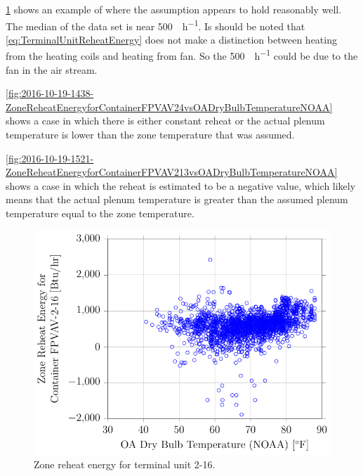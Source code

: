 \figref{}
\ref{fig:2016-10-19-1424-ZoneReheatEnergyforContainerFPVAV216vsOADryBulbTemperatureNOAA}
shows an example of where the assumption appears to hold reasonably well.  
The median of the data set is near \SI{500}{\btu\per\hour}. Is should be
noted that  \ref{eq:TerminalUnitReheatEnergy} does not make a
distinction between heating from the heating coils and heating from fan.
So the \SI{500}{\btu\per\hour} could be due to the fan in the air
stream. 

\figref{}
\ref{fig:2016-10-19-1438-ZoneReheatEnergyforContainerFPVAV24vsOADryBulbTemperatureNOAA}
shows a case in which there is either constant reheat or the actual
plenum temperature is lower than the zone temperature that was assumed.

\figref{}
\ref{fig:2016-10-19-1521-ZoneReheatEnergyforContainerFPVAV213vsOADryBulbTemperatureNOAA}
shows a case in which the reheat is estimated to be a negative value,
which likely means that the actual plenum temperature is greater than
the assumed plenum temperature equal to the zone temperature. 

\begin{figure}
\centering
\includegraphics[]{Plots/2016-10-19-1424-ZoneReheatEnergyforContainerFPVAV216vsOADryBulbTemperatureNOAA.pdf}
\caption{Zone reheat energy for terminal unit 2-16.}
\label{fig:2016-10-19-1424-ZoneReheatEnergyforContainerFPVAV216vsOADryBulbTemperatureNOAA}
\end{figure}

